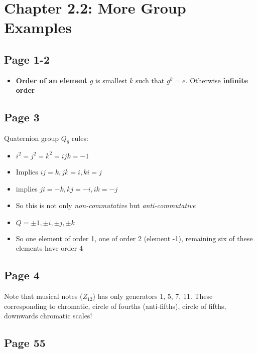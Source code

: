 \documentclass[11pt, oneside]{article}   	%
\begin{document}
\section {Chapter 2.2: More Group Examples}

\subsection {Page 1-2}

\begin{itemize}
\item \textbf{Order of an element} $g$ is smallest $k$ such that $g^k = e$.  Otherwise \textbf{infinite order}
\end{itemize}

\subsection {Page 3}

Quaternion group $Q_8$ rules:

\begin{itemize}
\item $i^2 = j^2 = k^2 = ijk =  - 1$
\item Implies $ij = k, jk = i, ki = j$
\item implies $ji = -k, kj = -i, ik = -j$
\item So this is not only \emph{non-commutative} but \emph{anti-commutative}
\item $Q = {\pm 1, \pm i, \pm j, \pm k}$
\item So one element of order 1, one of order 2 (element -1), remaining six of these elements have order 4
\end{itemize}

\subsection {Page 4}

Note that  musical notes ($Z_{12}$) has only generators 1, 5, 7, 11.  
These corresponding to chromatic, circle of fourths (anti-fifths), circle of fifths, downwards chromatic scales!

\subsection {Page 55}
\end{document}
